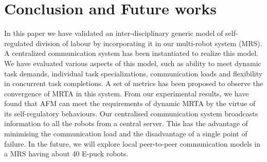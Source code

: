 \documentclass{llncs}
\begin{document}
\section{Conclusion and Future works}
\label{sec:conc}
In this paper we have validated an inter-disciplinary generic model of self-regulated division of labour by incorporating it in our multi-robot system (MRS). A centralized communication system has been instantiated to realize this model. We have evaluated various aspects of this model, such as ability to meet dynamic task demands, individual task specializations, communication loads and flexibility in concurrent task completions. A set of metrics has been proposed to observe the convergence of MRTA in this system. From our experimental results, we have found that AFM can meet the requirements of dynamic MRTA by the virtue of its self-regulatory behaviours. Our centralised communication system broadcasts information to all the robots from a central server. This has the advantage of minimising the communication load and the disadvantage of a single point of failure. In the future, we will explore local peer-to-peer communication models in a MRS having about 40 E-puck robots.
\bigskip
\end{document}
